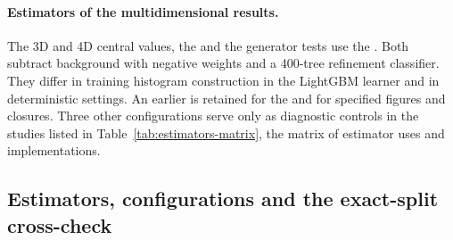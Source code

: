 \paragraph{Estimators of the multidimensional results.} The 3D and 4D central values, the \resSixteen{} and the generator tests use the \estMultiD{}. Both subtract background with negative weights and a 400-tree refinement classifier. They differ in training histogram construction in the LightGBM learner and in deterministic settings. An earlier \estPurity{} is retained for the \resFiveAxis{} and for specified figures and closures. Three other configurations serve only as diagnostic controls in the studies listed in Table~\ref{tab:estimators-matrix}, the matrix of estimator uses and implementations.

\subsection{Estimators, configurations and the exact-split cross-check}\label{recsec:method-estimators}


